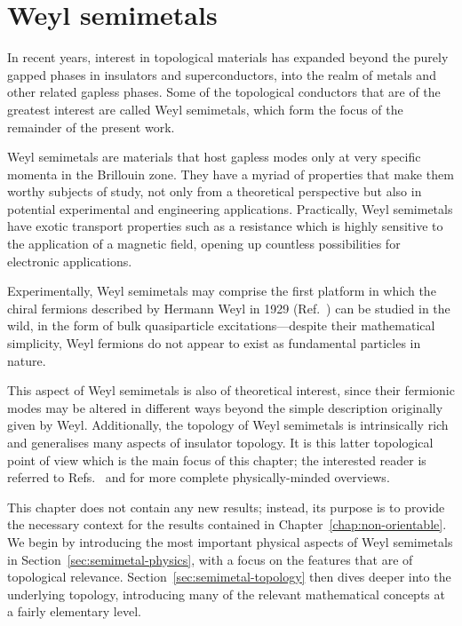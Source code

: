\chapter{Weyl semimetals}\label{chap:WSM}

In recent years, interest in topological materials has expanded beyond the purely gapped phases in insulators and superconductors, into the realm of metals and other related gapless phases. Some of the topological conductors that are of the greatest interest are called Weyl semimetals, which form the focus of the remainder of the present work.

Weyl semimetals are materials that host gapless modes only at very specific momenta in the Brillouin zone. They have a myriad of properties that make them worthy subjects of study, not only from a theoretical perspective but also in potential experimental and engineering applications. Practically, Weyl semimetals have exotic transport properties such as a resistance which is highly sensitive to the application of a magnetic field, opening up countless possibilities for electronic applications. 

Experimentally, Weyl semimetals may comprise the first platform in which the chiral fermions described by Hermann Weyl in 1929 (Ref.~\cite{Weyl_fermions}) can be studied in the wild, %
in the form of bulk quasiparticle excitations---despite their mathematical simplicity, Weyl fermions do not appear to exist as fundamental particles in nature. %

This aspect of Weyl semimetals is also of theoretical interest, since their fermionic modes may be altered in different ways beyond the simple description originally given by Weyl. Additionally, the topology of Weyl semimetals is intrinsically rich and generalises many aspects of insulator topology. It is this latter topological point of view which is the main focus of this chapter; the interested reader is referred to Refs.~\cite{Armitage_WSM-review} and \cite{Hosur_WSM-transport} for more complete physically-minded overviews.

This chapter does not contain any new results; instead, its purpose is to provide the necessary context for the results contained in Chapter~\ref{chap:non-orientable}. We begin by introducing the most important physical aspects of Weyl semimetals in Section~\ref{sec:semimetal-physics}, with a focus on the features that are of topological relevance. Section~\ref{sec:semimetal-topology} then dives deeper into the underlying topology, introducing many of the relevant mathematical concepts at a fairly elementary level.

